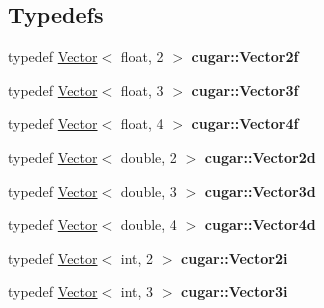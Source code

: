 \subsection*{Typedefs}
\begin{DoxyCompactItemize}
\item 
\mbox{\label{group___vectors_module_ga0301f64082db4a7f587bdd353096c67e}} 
typedef \hyperlink{structcugar_1_1_vector}{Vector}$<$ float, 2 $>$ {\bfseries cugar\+::\+Vector2f}
\item 
\mbox{\label{group___vectors_module_ga7f0a6b1b2e442fa30e267afdf6ce8a8d}} 
typedef \hyperlink{structcugar_1_1_vector}{Vector}$<$ float, 3 $>$ {\bfseries cugar\+::\+Vector3f}
\item 
\mbox{\label{group___vectors_module_ga2157df797e9e3dd147c467fe98d34940}} 
typedef \hyperlink{structcugar_1_1_vector}{Vector}$<$ float, 4 $>$ {\bfseries cugar\+::\+Vector4f}
\item 
\mbox{\label{group___vectors_module_ga98f185e4198a4414a68c07b8cc9ce8dc}} 
typedef \hyperlink{structcugar_1_1_vector}{Vector}$<$ double, 2 $>$ {\bfseries cugar\+::\+Vector2d}
\item 
\mbox{\label{group___vectors_module_ga61e4c6ff502e14059dbdab395689c325}} 
typedef \hyperlink{structcugar_1_1_vector}{Vector}$<$ double, 3 $>$ {\bfseries cugar\+::\+Vector3d}
\item 
\mbox{\label{group___vectors_module_ga86b6897c9a78db481b1f92679b3ad437}} 
typedef \hyperlink{structcugar_1_1_vector}{Vector}$<$ double, 4 $>$ {\bfseries cugar\+::\+Vector4d}
\item 
\mbox{\label{group___vectors_module_ga5bc2b64f6554ebdbd6ff926d047bde33}} 
typedef \hyperlink{structcugar_1_1_vector}{Vector}$<$ int, 2 $>$ {\bfseries cugar\+::\+Vector2i}
\item 
\mbox{\label{group___vectors_module_ga53a45f08978c683fe984318f276a3bed}} 
typedef \hyperlink{structcugar_1_1_vector}{Vector}$<$ int, 3 $>$ {\bfseries cugar\+::\+Vector3i}
\item 

\end{DoxyCompactItemize}
